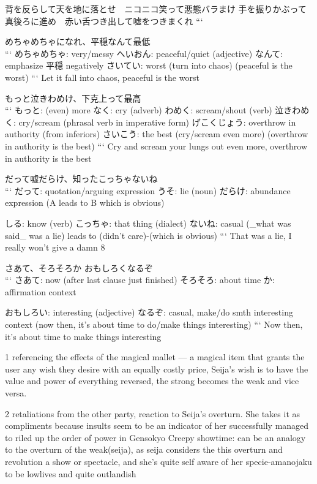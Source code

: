 背を反らして天を地に落とせ　ニコニコ笑って悪態バラまけ
手を振りかぶって真後ろに進め　赤い舌つき出して嘘をつきまくれ
```

めちゃめちゃになれ、平穏なんて最低 \\
```
めちゃめちゃ: very/messy
へいおん: peaceful/quiet (adjective)
なんて: emphasize 平穏 negatively
さいてい: worst
(turn into chaos) (peaceful is the worst)
```
Let it fall into chaos, peaceful is the worst

もっと泣きわめけ、下克上って最高 \\
```
もっと: (even) more
なく: cry (adverb)
わめく: scream/shout (verb)
泣きわめく: cry/scream (phrasal verb in imperative form)
げこくじょう: overthrow in authority (from inferiors)
さいこう: the best
(cry/scream even more) (overthrow in authority is the best)
```
Cry and scream your lungs out even more, overthrow in authority is the best

だって嘘だらけ、知ったこっちゃないね \\
```
だって: quotation/arguing expression
うそ: lie (noun)
だらけ: abundance expression (A leads to B which is obvious)

しる: know (verb)
こっちゃ: that thing (dialect)
ないね: casual
(_what was said_ was a lie) leads to (didn't care)-(which is obvious)
```
That was a lie, I really won't give a damn {8}

さあて、そろそろか おもしろくなるぞ \\
```
さあて: now (after last clause just finished)
そろそろ: about time
か: affirmation context

おもしろい: interesting (adjective)
なるぞ: casual, make/do smth interesting context
(now then, it's about time to do/make things interesting)
```
Now then, it's about time to make things interesting

{1} referencing the effects of the magical mallet --- a magical item that grants the user any wish they desire with an equally costly price, Seija's wish is to have the value and power of everything reversed, the strong becomes the weak and vice versa.

{2} retaliations from the other party, reaction to Seija's overturn. She takes it as compliments because insults seem to be an indicator of her successfully managed to riled up the order of power in Gensokyo
Creepy showtime: can be an analogy to the overturn of the weak(seija), as seija considers the this overturn and revolution a show or spectacle, and she's quite self aware of her specie-amanojaku to be lowlives and quite outlandish

